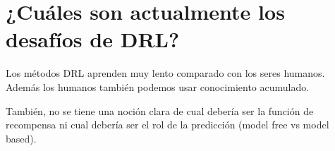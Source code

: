 \section{¿Cuáles son actualmente los desafíos de DRL?}%
\label{sec:_cuáles_son_actualmente_los_desafíos_de_drl_}

Los métodos DRL aprenden muy lento comparado con los seres humanos. Además los humanos también
podemos usar conocimiento acumulado.

También, no se tiene una noción clara de cual debería ser la función de recompensa ni cual
debería ser el rol de la predicción (model free vs model based).


